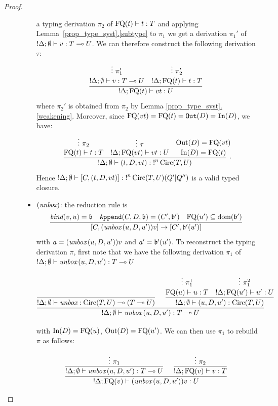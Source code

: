 \documentclass[twoside]{article}
\begin{document}
\begin{proof}
\begin{description}
\begin{itemize}
  a typing derivation $\pi_2$ of $\mathop{\textrm{FQ}}\nolimits(t)\vdash t:T$ and applying 
  Lemma~\hyperref[subtype]{\ref*{prop_type_syst}.\ref*{subtype}}
  to $\pi_1$ we get a derivation $\pi_1'$ of ${!}\Delta ;\emptyset\vdash v:T\multimap U$.
  We can therefore construct the following derivation $\tau$:
  \[
  \infer[]{{!}\Delta;\FQ(t)\entails vt : U}{
    \deduce[]{{!}\Delta ;\emptyset\entails v:T\loli U}{
      \vdots ~\pi_1'
    }
    &
    \deduce[]{{!}\Delta;\FQ(t)\entails t:T}{
      \vdots ~\pi_2'
    }
  }
  \]
  where $\pi_2'$ is obtained from $\pi_2$ by Lemma 
  \hyperref[weakening]{\ref*{prop_type_syst}.\ref*{weakening}}.
  Moreover, since $\mathop{\textrm{FQ}}\nolimits(vt)=\mathop{\textrm{FQ}}\nolimits(t)=\mathtt{Out}(D)=\mathtt{In}(D)$, 
  we have:
  \[
  \infer[.]{{!}\Delta;\emptyset \entails (t,D,vt):{!}^n\Circ(T,U)}{
    \deduce[]{\FQ(t)\entails t:T}{
      \vdots~\pi_2
    }
    &
    \deduce[]{{!}\Delta ; \FQ(vt)\entails vt:U}{
      \vdots~\tau
    } 
    &
    \deduce[]{\In(D)=\FQ(t) }{
      \Out(D)=\FQ(vt)
    }
  }
  \]  
  Hence ${!}\Delta ;\emptyset \vdash [C,(t,D,vt)]:{!}^n\mathop{\textrm{Circ}}\nolimits(T,U) (Q'|Q'')$ is 
  a valid typed closure.
  \item $(\mathop{\textit{unbox}}\nolimits)$: the reduction rule is
  \[
  \infer[]{[C,(\unbox\,(u,D,u'))v]\to [C',\binding'(u')]}{
    \bind(v,u)=\binding 
    &
    \mathtt{Append}(C,D,\binding) = (C',\binding') 
    &
    \FQ(u')\seq\dom(\binding')
  }
  \]
  with $a=(\mathop{\textit{unbox}}\nolimits\,(u,D,u'))v$ and $a'=\mathfrak{b}'(u')$. 
  To reconstruct the typing derivation $\pi$, first note 
  that we have the following derivation $\pi_1$ of    
  ${!}\Delta;\emptyset\vdash \mathop{\textit{unbox}}\nolimits\,(u,D,u'):T\multimap U$
  \begin{footnotesize}
  \[
    \infer[]{{!}\Delta;\emptyset\entails \unbox\,(u,D,u'):T\loli U}{
      \infer[]{{!}\Delta;\emptyset \entails \unbox:\Circ(T,U)\loli (T\loli U)}{
      }   
      &
      \infer[]{{!}\Delta ;\emptyset\entails (u,D,u'):\Circ(T,U)}{
        \deduce[]{\FQ(u)\entails u:T}{
          \vdots ~\pi_1^1
        }
        &
        \deduce[]{{!}\Delta;\FQ(u')\entails u':U}{
          \vdots ~\pi_1^2     
        }
      }
    }
    \]
  \end{footnotesize}%
  with $\mathop{\textrm{In}}\nolimits(D)=\mathop{\textrm{FQ}}\nolimits(u)$, $\mathop{\textrm{Out}}\nolimits(D)=\mathop{\textrm{FQ}}\nolimits(u')$. We can then use $\pi_1$ 
  to rebuild $\pi$ as follows:
  \begin{footnotesize}
  \[
  \infer[]{{!}\Delta; \FQ(v)\entails (\unbox\,(u,D,u'))v :U}{
    \infer[]{{!}\Delta;\emptyset\entails \unbox\,(u,D,u'):T\loli U}{
      \vdots~\pi_1            
    }
    &
    \infer[]{{!}\Delta ; \FQ(v)\entails v:T}{
      \vdots~\pi_2
    }
  }
  \]
  \end{footnotesize} 

\end{itemize}
\end{description}
\end{proof}
\end{document}
